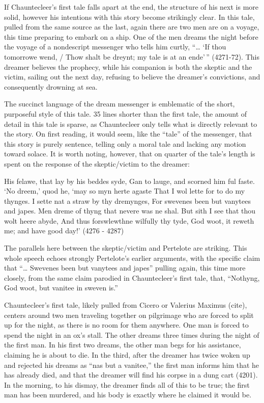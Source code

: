 \documentclass[
]{article}
\date{}
\begin{document}
If Chauntecleer's first tale falls apart at the end, the structure of
his next is more solid, however his intentions with this story become
strikingly clear. In this tale, pulled from the same source as the last,
again there are two men are on a voyage, this time preparing to embark
on a ship. One of the men dreams the night before the voyage of a
nondescript messenger who tells him curtly, ``\ldots{} `If thou
tomorrowe wend, / Thow shalt be dreynt; my tale is at an ende'\,''
(4271-72). This dreamer believes the prophecy, while his companion is
both the skeptic and the victim, sailing out the next day, refusing to
believe the dreamer's convictions, and consequently drowning at sea.

The succinct language of the dream messenger is emblematic of the short,
purposeful style of this tale. 35 lines shorter than the first tale, the
amount of detail in this tale is sparse, as Chauntecleer only tells what
is directly relevant to the story. On first reading, it would seem, like
the ``tale'' of the messenger, that this story is purely sentence,
telling only a moral tale and lacking any motion toward solace. It is
worth noting, however, that on quarter of the tale's length is spent on
the response of the skeptic/victim to the dreamer:

His felawe, that lay by his beddes syde, Gan to lauge, and scorned him
ful faste. `No dreem,' quod he, `may so myn herte agaste That I wol
lette for to do my thynges. I sette nat a straw by thy dremynges, For
swevenes been but vanytees and japes. Men dreme of thyng that nevere was
ne shal. But sith I see that thou wolt heere abyde, And thus
forswlewthne wilfully thy tyde, God woot, it reweth me; and have good
day!' (4276 - 4287)

The parallels here between the skeptic/victim and Pertelote are
striking. This whole speech echoes strongly Pertelote's earlier
arguments, with the specific claim that ``\ldots{} Swevenes been but
vanytees and japes'' pulling again, this time more closely, from the
same claim parodied in Chauntecleer's first tale, that, ``Nothyng, God
woot, but vanitee in sweven is.''

Chauntecleer's first tale, likely pulled from Cicero or Valerius Maximus
(cite), centers around two men traveling together on pilgrimage who are
forced to split up for the night, as there is no room for them anywhere.
One man is forced to spend the night in an ox's stall. The other dreams
three times during the night of the first man. In his first two dreams,
the other man begs for his assistance, claiming he is about to die. In
the third, after the dreamer has twice woken up and rejected his dreams
as ``nas but a vanitee,'' the first man informs him that he has already
died, and that the dreamer will find his corpse in a dung cart (4201).
In the morning, to his dismay, the dreamer finds all of this to be true;
the first man has been murdered, and his body is exactly where he
claimed it would be.
\end{document}
